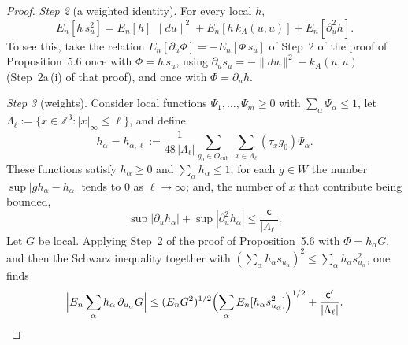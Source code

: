 \documentclass[11pt,letterpaper,reqno]{amsart}
\theoremstyle{definition}
\begin{document}
\begin{proof}
\emph{Step 2} (a weighted identity).
For every local $h$,
\begin{equation*}
E_n[h\,s_u^2]=E_n[h]\,\|du\|^2+E_n[h\,k_A(u,u)]+E_n[\partial_u^2h].
\end{equation*}
To see this, take the relation $E_n[\partial_u\Phi]=-E_n[\Phi\,s_u]$ of Step~2 of the proof of Proposition~5.6 once with $\Phi=h\,s_u$, using $\partial_us_u=-\|du\|^2-k_A(u,u)$ (Step~2a\,(i) of that proof),
and once with $\Phi=\partial_uh$.

\emph{Step 3} (weights).
Consider local functions $\Psi_1,\dots,\Psi_m\ge0$ with $\sum_\alpha\Psi_\alpha\le1$, let $\Lambda_\ell:=\{x\in\mathbb Z^3:|x|_\infty\le\ell\}$, and define
\begin{equation*}
h_\alpha=h_{\alpha,\ell}:=\frac{1}{48\,|\Lambda_\ell|}\sum_{g_0\in O_{\mathrm{cub}}}\ \sum_{x\in\Lambda_\ell}(\tau_xg_0)\Psi_\alpha.
\end{equation*}
These functions satisfy $h_\alpha\ge0$ and $\sum_\alpha h_\alpha\le1$;
for each $g\in W$ the number $\sup|gh_\alpha-h_\alpha|$ tends to $0$ as $\ell\to\infty$;
and, the number of $x$ that contribute being bounded,
\begin{equation*}
\sup|\partial_uh_\alpha|+\sup|\partial_u^2h_\alpha|\le\frac{\mathsf c}{|\Lambda_\ell|}.
\end{equation*}
Let $G$ be local.
Applying Step~2 of the proof of Proposition~5.6 with $\Phi=h_\alpha G$, and then the Schwarz inequality together with $(\sum_\alpha h_\alpha s_{u_\alpha})^2\le\sum_\alpha h_\alpha s_{u_\alpha}^2$, one finds
\begin{equation*}
\Bigl|E_n\sum_\alpha h_\alpha\,\partial_{u_\alpha}G\Bigr|\le(E_nG^2)^{1/2}\Bigl(\sum_\alpha E_n[h_\alpha s_{u_\alpha}^2]\Bigr)^{1/2}+\frac{\mathsf c'}{|\Lambda_\ell|}.
\end{equation*}


\end{proof}
\end{document}
